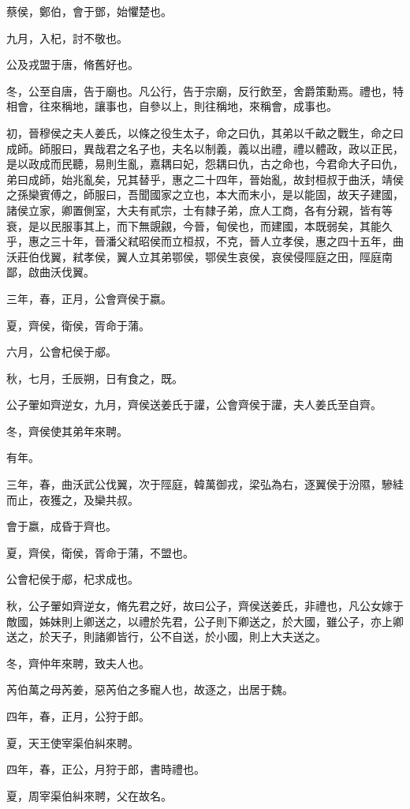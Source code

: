 \begin{pinyinscope}
蔡侯，鄭伯，會于鄧，始懼楚也。

九月，入杞，討不敬也。

公及戎盟于唐，脩舊好也。

冬，公至自唐，告于廟也。凡公行，告于宗廟，反行飲至，舍爵策勳焉。禮也，特相會，往來稱地，讓事也，自參以上，則往稱地，來稱會，成事也。

初，晉穆侯之夫人姜氏，以條之役生太子，命之曰仇，其弟以千畝之戰生，命之曰成師。師服曰，異哉君之名子也，夫名以制義，義以出禮，禮以體政，政以正民，是以政成而民聽，易則生亂，嘉耦曰妃，怨耦曰仇，古之命也，今君命大子曰仇，弟曰成師，始兆亂矣，兄其替乎，惠之二十四年，晉始亂，故封桓叔于曲沃，靖侯之孫欒賓傅之，師服曰，吾聞國家之立也，本大而末小，是以能固，故天子建國，諸侯立家，卿置側室，大夫有貳宗，士有隸子弟，庶人工商，各有分親，皆有等衰，是以民服事其上，而下無覬覦，今晉，甸侯也，而建國，本既弱矣，其能久乎，惠之三十年，晉潘父弒昭侯而立桓叔，不克，晉人立孝侯，惠之四十五年，曲沃莊伯伐翼，弒孝侯，翼人立其弟鄂侯，鄂侯生哀侯，哀侯侵陘庭之田，陘庭南鄙，啟曲沃伐翼。

三年，春，正月，公會齊侯于嬴。

夏，齊侯，衛侯，胥命于蒲。

六月，公會杞侯于郕。

秋，七月，壬辰朔，日有食之，既。

公子翬如齊逆女，九月，齊侯送姜氏于讙，公會齊侯于讙，夫人姜氏至自齊。

冬，齊侯使其弟年來聘。

有年。

三年，春，曲沃武公伐翼，次于陘庭，韓萬御戎，梁弘為右，逐翼侯于汾隰，驂絓而止，夜獲之，及欒共叔。

會于嬴，成昏于齊也。

夏，齊侯，衛侯，胥命于蒲，不盟也。

公會杞侯于郕，杞求成也。

秋，公子翬如齊逆女，脩先君之好，故曰公子，齊侯送姜氏，非禮也，凡公女嫁于敵國，姊妹則上卿送之，以禮於先君，公子則下卿送之，於大國，雖公子，亦上卿送之，於天子，則諸卿皆行，公不自送，於小國，則上大夫送之。

冬，齊仲年來聘，致夫人也。

芮伯萬之母芮姜，惡芮伯之多寵人也，故逐之，出居于魏。

四年，春，正月，公狩于郎。

夏，天王使宰渠伯糾來聘。

四年，春，正公，月狩于郎，書時禮也。

夏，周宰渠伯糾來聘，父在故名。


\end{pinyinscope}
